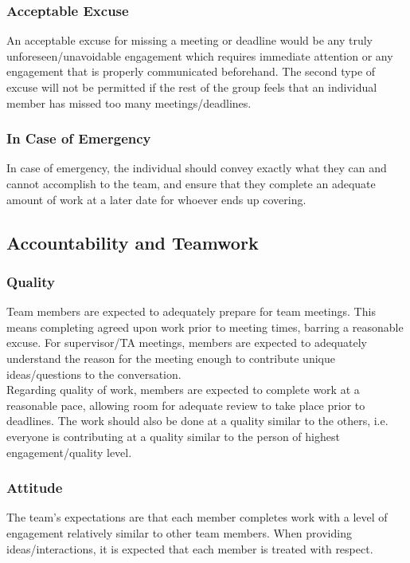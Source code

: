 \documentclass{article}
\begin{document}
\subsubsection*{Acceptable Excuse}

An acceptable excuse for missing a meeting or deadline would be any truly
unforeseen/unavoidable engagement which requires immediate attention or any engagement 
that is properly communicated beforehand. The second type of excuse will not be 
permitted if the rest of the group feels that an individual member has missed too 
many meetings/deadlines.

\subsubsection*{In Case of Emergency}

In case of emergency, the individual should convey exactly what they can and cannot accomplish to
the team, and ensure that they complete an adequate amount of work at a later date 
for whoever ends up covering.

\subsection*{Accountability and Teamwork}

\subsubsection*{Quality}

Team members are expected to adequately prepare for team meetings. This means completing 
agreed upon work prior to meeting times, barring a reasonable excuse. For supervisor/TA
meetings, members are expected to adequately understand the reason for the meeting enough
to contribute unique ideas/questions to the conversation.\\ 

Regarding quality of work, members are expected to complete work at a reasonable pace, allowing room 
for adequate review to take place prior to deadlines. The work should also be done at a quality
similar to the others, i.e. everyone is contributing at a quality similar to the person of highest
engagement/quality level.

\subsubsection*{Attitude}

The team's expectations are that each member completes work with a level of engagement
relatively similar to other team members. When providing ideas/interactions, it is 
expected that each member is treated with respect.
\end{document}
